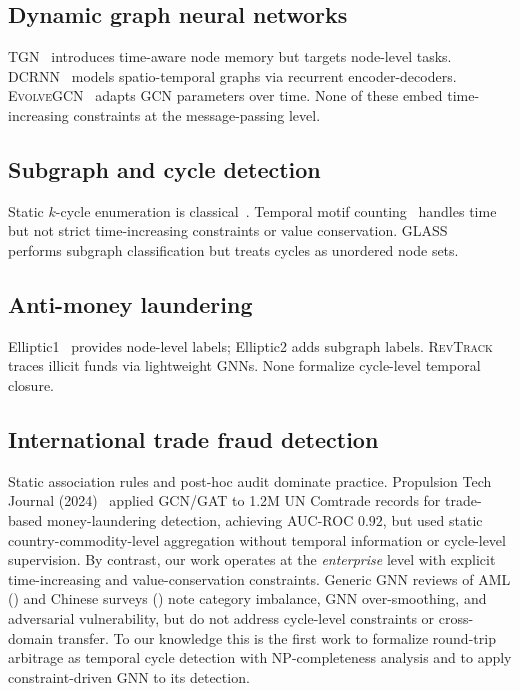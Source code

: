 \documentclass[journal,onecolumn]{IEEEtran}
\begin{document}
\subsection{Dynamic graph neural networks}
\label{sec:related-dgnn}

\textsc{TGN}~\cite{tgn2020} introduces time-aware node memory but targets
node-level tasks. \textsc{DCRNN}~\cite{dcrnn2018} models spatio-temporal
graphs via recurrent encoder-decoders. \textsc{EvolveGCN}~\cite{evolvegcn2020}
adapts GCN parameters over time. None of these embed time-increasing
constraints at the message-passing level.

\subsection{Subgraph and cycle detection}
\label{sec:related-cycle}

Static $k$-cycle enumeration is classical~\cite{ayz1995}. Temporal motif
counting~\cite{fastMotif2017} handles time but not strict
time-increasing constraints or value conservation. GLASS~\cite{glass2021}
performs subgraph classification but treats cycles as unordered node sets.

\subsection{Anti-money laundering}
\label{sec:related-aml}

Elliptic1~\cite{ellipticData2019} provides node-level labels; Elliptic2
adds subgraph labels. \textsc{RevTrack}~\cite{revtrack2023} traces illicit
funds via lightweight GNNs. None formalize cycle-level temporal closure.

\subsection{International trade fraud detection}
\label{sec:related-trade}

Static association rules and post-hoc audit dominate practice.
Propulsion Tech Journal (2024)~\cite{propulsion2024} applied GCN/GAT
to 1.2M UN Comtrade records for trade-based money-laundering
detection, achieving AUC-ROC $0.92$, but used static
country-commodity-level aggregation without temporal information or
cycle-level supervision. By contrast, our work operates at the
\emph{enterprise} level with explicit time-increasing and
value-conservation constraints. Generic GNN reviews of AML
(\cite{lawal2025,bisAurora2024,inspectionL2024}) and Chinese surveys
(\cite{gnnChineseReview2025}) note category imbalance, GNN
over-smoothing, and adversarial vulnerability, but do not address
cycle-level constraints or cross-domain transfer. To our knowledge
this is the first work to formalize round-trip arbitrage as temporal
cycle detection with NP-completeness analysis and to apply
constraint-driven GNN to its detection.
\end{document}
